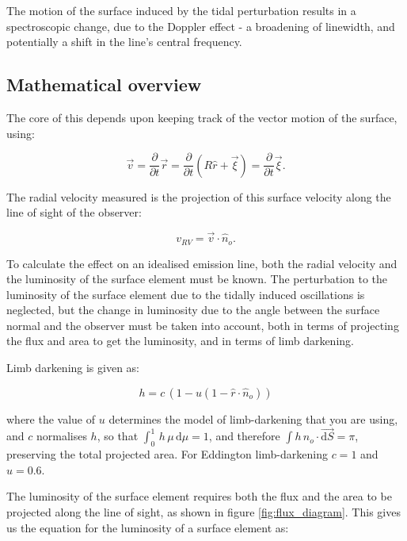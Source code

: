 \documentclass[11pt]{amsart}
\begin{document}
The motion of the surface induced by the tidal perturbation results in a spectroscopic change, due to the Doppler effect - a broadening of linewidth, and potentially a shift in the line's central frequency.

\subsection{Mathematical overview} \label{RV_overview}

The core of this depends upon keeping track of the vector motion of the surface, using:

\begin{equation}
\vec{v} = \frac{\partial}{\partial t} \vec{r} = \frac{\partial}{\partial t} ( R \hat{r} + \vec{\xi} ) = \frac{\partial}{\partial t} \vec{\xi} .
\end{equation}

The radial velocity measured is the projection of this surface velocity along the line of sight of the observer:

\begin{equation}
v_{RV} = \vec{v} \cdot \hat{n}_{o}.
\end{equation}

To calculate the effect on an idealised emission line, both the radial velocity and the luminosity of the surface element must be known.  The perturbation to the luminosity of the surface element due to the tidally induced oscillations is neglected, but the change in luminosity due to the angle between the surface normal and the observer must be taken into account, both in terms of projecting the flux and area to get the luminosity, and in terms of limb darkening.

Limb darkening is given as:

\begin{equation}
h = c \, ( 1 - u (1 - \hat{r} \! \cdot \! \hat{n}_{o}) )
\end{equation}

where the value of $u$ determines the model of limb-darkening that you are using, and $c$ normalises $h$, so that $\int_{0}^{1} \, h \, \mu \, \text{d}\mu = 1$, and therefore $\int h \, \hat{n}_{o} \! \cdot \! \vec{\text{d} S} = \pi$, preserving the total projected area.  For Eddington limb-darkening $c = 1$ and $u = 0.6$.

The luminosity of the surface element requires both the flux and the area to be projected along the line of sight, as shown in figure \ref{fig:flux_diagram}.  This gives us the equation for the luminosity of a surface element as:
\end{document}
